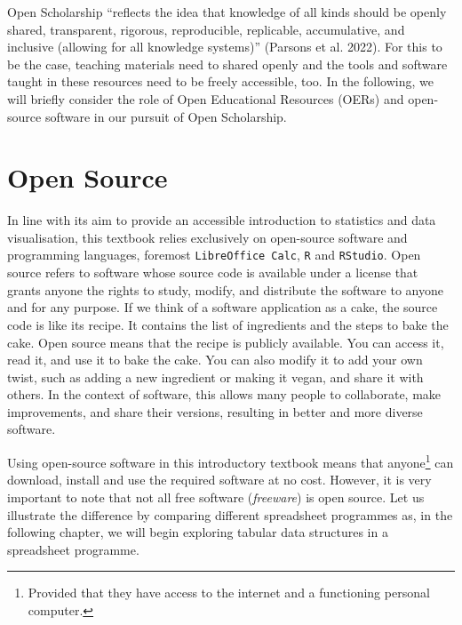 \documentclass[
  letterpaper,
  DIV=11,
  numbers=noendperiod,
  oneside]{scrreprt}
\begin{document}
Open Scholarship ``reflects the idea that knowledge of all kinds should
be openly shared, transparent, rigorous, reproducible, replicable,
accumulative, and inclusive (allowing for all knowledge systems)''
(Parsons et al. 2022). For this to be the case, teaching materials need
to shared openly and the tools and software taught in these resources
need to be freely accessible, too. In the following, we will briefly
consider the role of Open Educational Resources (OERs) and open-source
software in our pursuit of Open Scholarship.

\section{Open Source}\label{open-source}

In line with its aim to provide an accessible introduction to statistics
and data visualisation, this textbook relies exclusively on open-source
software and programming languages, foremost \texttt{LibreOffice\ Calc},
\texttt{R} and \texttt{RStudio}. Open source refers to software whose
source code is available under a license that grants anyone the rights
to study, modify, and distribute the software to anyone and for any
purpose. If we think of a software application as a cake, the source
code is like its recipe. It contains the list of ingredients and the
steps to bake the cake. Open source means that the recipe is publicly
available. You can access it, read it, and use it to bake the cake. You
can also modify it to add your own twist, such as adding a new
ingredient or making it vegan, and share it with others. In the context
of software, this allows many people to collaborate, make improvements,
and share their versions, resulting in better and more diverse software.

Using open-source software in this introductory textbook means that
anyone\footnote{Provided that they have access to the internet and a
  functioning personal computer.} can download, install and use the
required software at no cost. However, it is very important to note that
not all free software (\emph{freeware}) is open source. Let us
illustrate the difference by comparing different spreadsheet programmes
as, in the following chapter, we will begin exploring tabular data
structures in a spreadsheet programme.
\end{document}
